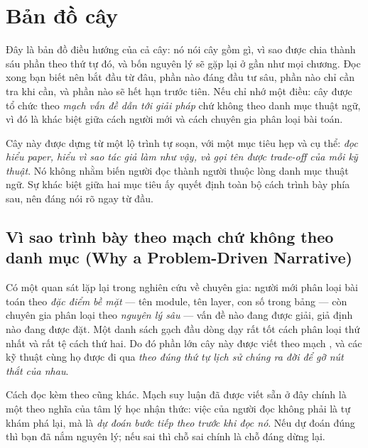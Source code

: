 \documentclass[deep_learning.tex]{subfiles}
\begin{document}
\chapter*{Bản đồ cây}

\begin{tomtat}
Đây là bản đồ điều hướng của cả cây: nó nói cây gồm gì, vì sao được chia thành sáu phần theo thứ tự đó, và bốn nguyên lý sẽ gặp lại ở gần như mọi chương. Đọc xong bạn biết nên bắt đầu từ đâu, phần nào đáng đầu tư sâu, phần nào chỉ cần tra khi cần, và phần nào sẽ hết hạn trước tiên. Nếu chỉ nhớ một điều: cây được tổ chức theo \emph{mạch vấn đề dẫn tới giải pháp} chứ không theo danh mục thuật ngữ, vì đó là khác biệt giữa cách người mới và cách chuyên gia phân loại bài toán.
\end{tomtat}

Cây này được dựng từ một lộ trình tự soạn, với một mục tiêu hẹp và cụ thể: \emph{đọc hiểu paper, hiểu vì sao tác giả làm như vậy, và gọi tên được trade-off của mỗi kỹ thuật}. Nó không nhằm biến người đọc thành người thuộc lòng danh mục thuật ngữ. Sự khác biệt giữa hai mục tiêu ấy quyết định toàn bộ cách trình bày phía sau, nên đáng nói rõ ngay từ đầu.

\section*{Vì sao trình bày theo mạch chứ không theo danh mục (Why a Problem-Driven Narrative)}

Có một quan sát lặp lại trong nghiên cứu về chuyên gia: người mới phân loại bài toán theo \emph{đặc điểm bề mặt} --- tên module, tên layer, con số trong bảng --- còn chuyên gia phân loại theo \emph{nguyên lý sâu} --- vấn đề nào đang được giải, giả định nào đang được đặt. Một danh sách gạch đầu dòng dạy rất tốt cách phân loại thứ nhất và rất tệ cách thứ hai. Do đó phần lớn cây này được viết theo mạch  \ra {} \ra {} \ra {} \ra {}, và các kỹ thuật cùng họ được đi qua \emph{theo đúng thứ tự lịch sử chúng ra đời để gỡ nút thắt của nhau}.

Cách đọc kèm theo cũng khác. Mạch suy luận đã được viết sẵn ở đây chính là một  theo nghĩa của tâm lý học nhận thức: việc của người đọc không phải là tự khám phá lại, mà là \emph{dự đoán bước tiếp theo trước khi đọc nó}. Nếu dự đoán đúng thì bạn đã nắm nguyên lý; nếu sai thì chỗ sai chính là chỗ đáng dừng lại.
\end{document}
